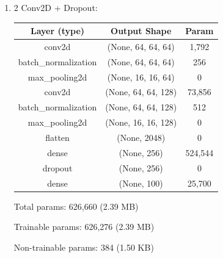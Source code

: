 \documentclass{article}
\begin{document}
\begin{enumerate}
            \item 2 Conv2D + Dropout:
            \begin{table}[h!]
                \begin{tabular}{| c | c | c |}
                    \hline
                    Layer (type) & Output Shape & Param \\
                    \hline
                    conv2d & (None, 64, 64, 64) & 1,792 \\
                    \hline
                    batch\_normalization & (None, 64, 64, 64) & 256 \\
                    \hline
                    max\_pooling2d & (None, 16, 16, 64) & 0 \\
                    \hline
                    conv2d & (None, 64, 64, 128) & 73,856 \\
                    \hline
                    batch\_normalization & (None, 64, 64, 128) & 512 \\
                    \hline
                    max\_pooling2d & (None, 16, 16, 128) & 0 \\
                    \hline
                    flatten & (None, 2048) & 0 \\
                    \hline
                    dense & (None, 256) & 524,544 \\
                    \hline
                    dropout & (None, 256) & 0 \\
                    \hline
                    dense & (None, 100) &  25,700 \\
                    \hline
                \end{tabular}
            \end{table}

            Total params: 626,660 (2.39 MB)

            Trainable params: 626,276 (2.39 MB)

            Non-trainable params: 384 (1.50 KB)
        
        \newpage


\end{enumerate}
\end{document}
